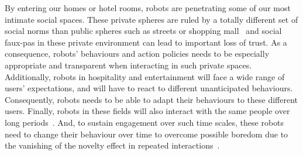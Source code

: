     By entering our homes or hotel rooms, robots are penetrating some of our most intimate social spaces. These private spheres are ruled by a totally different set of social norms than public spheres such as streets or shopping mall~\citep{weintraub1997theory} and social faux-pas in these private environment can lead to important loss of trust. As a consequence, robots' behaviours and action policies needs to be especially appropriate and transparent when interacting in such private spaces. Additionally, robots in hospitality and entertainment will face a wide range of users' expectations, and will have to react to different unanticipated behaviours. Consequently, robots needs to be able to adapt their behaviours to these different users. Finally, robots in these fields will also interact with the same people over long periods~\citep{leite2013social}. And, to sustain engagement over such time scales, these robots need to change their behaviour over time to overcome possible boredom due to the vanishing of the novelty effect in repeated interactions~\citep{salter2004robots}.%

